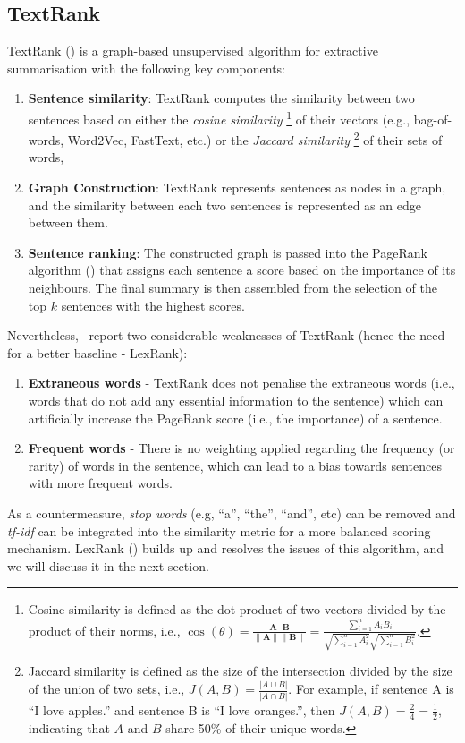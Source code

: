 \subsection{TextRank}\label{subsec:textrank}
TextRank (\cite{mihalcea-tarau-2004-textrank}) is a graph-based unsupervised algorithm for extractive summarisation with the following key components:
\begin{enumerate}
    \item \textbf{Sentence similarity}: TextRank computes the similarity between two sentences based on either the \emph{cosine similarity}
        \footnote{
            Cosine similarity is defined as the dot product of two vectors divided by the product of their norms, i.e., $\cos(\theta) = \frac{\mathbf{A} \cdot \mathbf{B}}{\|\mathbf{A}\| \|\mathbf{B}\|} = \frac{\sum_{i=1}^{n} A_i B_i}{\sqrt{\sum_{i=1}^{n} A_i^2} \sqrt{\sum_{i=1}^{n} B_i^2}}$.
        } of their vectors (e.g., bag-of-words, Word2Vec, FastText, etc.) or the \emph{Jaccard similarity}
        \footnote{
            Jaccard similarity is defined as the size of the intersection  divided by the size of the union of two sets, i.e., $J(A,B)= \frac{|A\cup B|}{|A\cap B|}$.
            For example, if sentence A is ``I love apples.'' and sentence B is ``I love oranges.'', then $J(A,B)=\frac{2}{4}=\frac{1}{2}$, indicating that $A$ and $B$ share 50\% of their unique words.
        } of their sets of words,
    \item \textbf{Graph Construction}: TextRank represents sentences as nodes in a graph, and the similarity between each two sentences is represented as an edge between them.
    \item \textbf{Sentence ranking}: The constructed graph is passed into the PageRank algorithm (\cite{page1998anatomy}) that assigns each sentence a score based on the importance of its neighbours.
    The final summary is then assembled from the selection of the top $k$ sentences with the highest scores.
\end{enumerate}
Nevertheless,~\cite{Shearing2020AutomatedTS} report two considerable weaknesses of TextRank (hence the need for a better baseline - LexRank):
\begin{enumerate}
    \item \textbf{Extraneous words} - TextRank does not penalise the extraneous words (i.e., words that do not add any essential information to the sentence) which can artificially increase the PageRank score (i.e., the importance) of a sentence.
    \item \textbf{Frequent words} - There is no weighting applied regarding the frequency (or rarity) of words in the sentence, which can lead to a bias towards sentences with more frequent words.
\end{enumerate}
As a countermeasure, \emph{stop words} (e.g, ``a'', ``the'', ``and'', etc) can be removed and \emph{tf-idf} can be integrated into the similarity metric for a more balanced scoring mechanism.
LexRank (\cite{Erkan2004LexRankGC}) builds up and resolves the issues of this algorithm, and we will discuss it in the next section.

